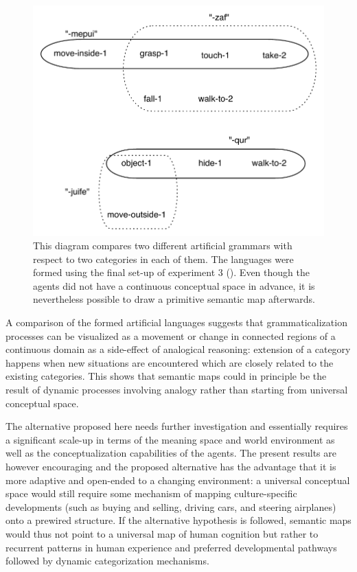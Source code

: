\begin{figure}[t]
\centerline{\includegraphics[scale=0.7]{Chapter5/figs/sem-map1}}
  \caption[Two ``semantic maps'' from the experiments]{This diagram compares two different artificial grammars with respect to two categories in each of them. The languages were formed using the final set-up of experiment 3 (). Even though the agents did not have a continuous conceptual space in advance, it is nevertheless possible to draw a primitive semantic map afterwards.}
   \label{f:semmap-1}
\end{figure}


A comparison of the formed artificial languages suggests that grammaticalization processes can be visualized as a movement or change in connected regions of a continuous domain as a side-effect of analogical reasoning: extension of a category happens when new situations are encountered which are closely related to the existing categories. This shows that semantic maps could in principle be the result of dynamic processes involving analogy rather than starting from universal conceptual space.

\newpage
The alternative proposed here needs further investigation and essentially requires a significant scale-up in terms of the meaning space and world environment as well as the conceptualization capabilities of the agents. The present results are however encouraging and the proposed alternative has the advantage that it is more adaptive and open-ended to a changing environment: a universal conceptual space would still require some mechanism of mapping culture-specific developments (such as buying and selling, driving cars, and steering airplanes) onto a prewired structure. If the alternative hypothesis is followed, semantic maps would thus not point to a universal map of human cognition but rather to recurrent patterns in human experience and preferred developmental pathways followed by dynamic categorization mechanisms.

